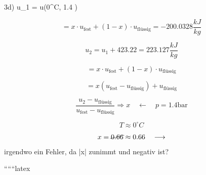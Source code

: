 3d) \quad u_1 = u(0^\circ C, 1.4 ) \Rightarrow

\[
= x \cdot u_{\text{fest}} + (1-x) \cdot u_{\text{flüssig}} = -200.0328 \frac{kJ}{kg}
\]

\[
u_2 = u_1 + 423.22 = 223.127 \frac{kJ}{kg}
\]

\[
= x \cdot u_{\text{fest}} + (1-x) \cdot u_{\text{flüssig}}
\]

\[
= x \left( u_{\text{fest}} - u_{\text{flüssig}} \right) + u_{\text{flüssig}}
\]

\[
\frac{u_2 - u_{\text{flüssig}}}{u_{\text{fest}} - u_{\text{flüssig}}} \Rightarrow x \quad \longleftarrow \quad p = 1.4 \text{bar}
\]

\[
T \approx 0^\circ C
\]

\[
x = \cancel{0.66} \approx 0.66 \quad \longrightarrow
\]

irgendwo ein Fehler, da |x| zunimmt und negativ ist?

``````latex


